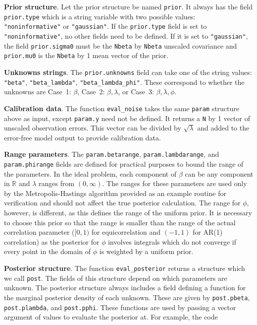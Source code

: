\documentclass{book}
\begin{document}
\vspace{.1in}
\textbf{Prior structure}. Let the prior structure be named {\tt prior}. It always has the field {\tt prior.type} which is a string variable with
two possible values: {\tt "noninformative"} or {\tt "gaussian"}. If the {\tt prior.type} field is set to {\tt "noninformative"}, no other
fields need to be defined. If it is set to {\tt "gaussian"}, the field {\tt prior.sigma0} must be the {\tt Nbeta} by {\tt Nbeta}
unscaled covariance and {\tt prior.mu0} is the {\tt Nbeta} by 1 mean vector of the prior. 

\vspace{.1in}
\textbf{Unknowns strings}. The {\tt prior.unknowns} field can take one of the string values:
{\tt "beta"}, {\tt"beta\_lambda"}, {\tt"beta\_lambda\_phi"}. These correspond to whether the unknowns are Case~1: $\beta$, 
Case~2: $\beta, \lambda$, or Case~3: $\beta,\lambda,\phi$. 

\vspace{.1in}
\textbf{Calibration data}. The function {\tt eval\_noise} takes the same {\tt param} structure above as input, except {\tt param.y}
need not be defined. It returns a {\tt N} by 1 vector of unscaled observation errors. This vector can be divided by $\sqrt{\lambda}$
and added to the error-free model output to provide calibration data.

\vspace{.1in}
\textbf{Range parameters}. The {\tt param.betarange}, {\tt param.lambdarange}, and {\tt param.phirange} fields are defined
for practical purposes to bound the range of the parameters. In the ideal problem, each component of $\beta$ can be
any component in $\mathbb{R}$ and $\lambda$ ranges from $(0, \infty)$. The ranges for these parameters are used only by the 
Metropolis-Hastings algorithm provided as an example routine for verification and should not affect the true posterior calculation.
The range for $\phi$, however, is different, as this defines the range of the uniform prior. It is necessary to choose this prior so that
the range is smaller than the range of the actual correlation parameter ($[0,1)$ for equicorrelation and $(-1, 1)$ for AR(1) 
correlation) as the posterior for $\phi$ involves integrals which do not converge if every point in the domain of $\phi$ is 
weighted by a uniform prior. 

\vspace{.1in}
\textbf{Posterior structure}. The function {\tt eval\_posterior} returns a structure which we call {\tt post}. The fields of
this structure depend on which parameters are unknown. The posterior structure always includes a field defining
a function for the marginal posterior density of each unknown. These are given by {\tt post.pbeta},
{\tt post.plambda}, and {\tt post.pphi}. These functions are used by passing a vector argument of values to evaluate
the posterior at. For example, the code
\end{document}
